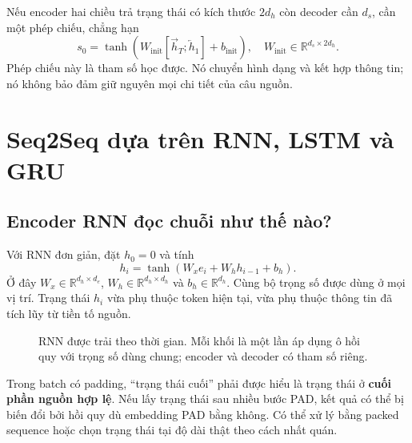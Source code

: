 \documentclass[11pt,a4paper]{article}
\numberwithin{equation}{section}
\newcommand{\R}{\mathbb{R}}
\newcommand{\BOS}{\langle\mathrm{BOS}\rangle}
\newcommand{\EOS}{\langle\mathrm{EOS}\rangle}
\begin{document}
Nếu encoder hai chiều trả trạng thái có kích thước $2d_h$ còn decoder cần $d_s$, cần một phép chiếu, chẳng hạn
\begin{equation}
s_0=\tanh(W_{\mathrm{init}}[\overrightarrow h_T;\overleftarrow h_1]+b_{\mathrm{init}}),
\quad W_{\mathrm{init}}\in\R^{d_s\times 2d_h}.
\end{equation}
Phép chiếu này là tham số học được. Nó chuyển hình dạng và kết hợp thông tin; nó không bảo đảm giữ nguyên mọi chi tiết của câu nguồn.

\section{Seq2Seq dựa trên RNN, LSTM và GRU}
\subsection{Encoder RNN đọc chuỗi như thế nào?}
Với RNN đơn giản, đặt $h_0=0$ và tính
\begin{equation}\label{eq:rnn}
h_i=\tanh(W_xe_i+W_hh_{i-1}+b_h).
\end{equation}
Ở đây $W_x\in\R^{d_h\times d_e}$, $W_h\in\R^{d_h\times d_h}$ và $b_h\in\R^{d_h}$. Cùng bộ trọng số được dùng ở mọi vị trí. Trạng thái $h_i$ vừa phụ thuộc token hiện tại, vừa phụ thuộc thông tin đã tích lũy từ tiền tố nguồn.

\begin{figure}[H]
\centering
{}
\caption{RNN được trải theo thời gian. Mỗi khối là một lần áp dụng ô hồi quy với trọng số dùng chung; encoder và decoder có tham số riêng.}
\end{figure}
Trong batch có padding, ``trạng thái cuối'' phải được hiểu là trạng thái ở \textbf{cuối phần nguồn hợp lệ}. Nếu lấy trạng thái sau nhiều bước PAD, kết quả có thể bị biến đổi bởi hồi quy dù embedding PAD bằng không. Có thể xử lý bằng packed sequence hoặc chọn trạng thái tại độ dài thật theo cách nhất quán.
\end{document}
